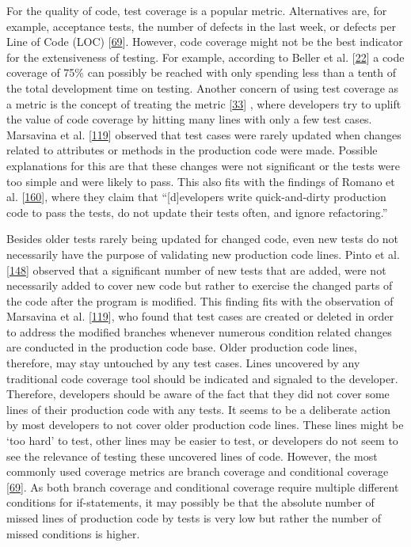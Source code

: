 \documentclass[]{book}
\begin{document}
For the quality of code, test coverage is a popular metric. Alternatives
are, for example, acceptance tests, the number of defects in the last
week, or defects per Line of Code (LOC)
{[}\protect\hyperlink{ref-GAROUSI20131354}{69}{]}. However, code
coverage might not be the best indicator for the extensiveness of
testing. For example, according to Beller et al.
{[}\protect\hyperlink{ref-Beller:2015:DT:2819009.2819101}{22}{]} a code
coverage of 75\% can possibly be reached with only spending less than a
tenth of the total development time on testing. Another concern of using
test coverage as a metric is the concept of treating the metric
{[}\protect\hyperlink{ref-bouwers2012a}{33}{]} , where developers try to
uplift the value of code coverage by hitting many lines with only a few
test cases. Marsavina et al.
{[}\protect\hyperlink{ref-marsavina2014}{119}{]} observed that test
cases were rarely updated when changes related to attributes or methods
in the production code were made. Possible explanations for this are
that these changes were not significant or the tests were too simple and
were likely to pass. This also fits with the findings of Romano et al.
{[}\protect\hyperlink{ref-ROMANO201764}{160}{]}, where they claim that
``{[}d{]}evelopers write quick-and-dirty production code to pass the
tests, do not update their tests often, and ignore refactoring.''

Besides older tests rarely being updated for changed code, even new
tests do not necessarily have the purpose of validating new production
code lines. Pinto et al.
{[}\protect\hyperlink{ref-pinto2012understanding}{148}{]} observed that
a significant number of new tests that are added, were not necessarily
added to cover new code but rather to exercise the changed parts of the
code after the program is modified. This finding fits with the
observation of Marsavina et al.
{[}\protect\hyperlink{ref-marsavina2014}{119}{]}, who found that test
cases are created or deleted in order to address the modified branches
whenever numerous condition related changes are conducted in the
production code base. Older production code lines, therefore, may stay
untouched by any test cases. Lines uncovered by any traditional code
coverage tool should be indicated and signaled to the developer.
Therefore, developers should be aware of the fact that they did not
cover some lines of their production code with any tests. It seems to be
a deliberate action by most developers to not cover older production
code lines. These lines might be `too hard' to test, other lines may be
easier to test, or developers do not seem to see the relevance of
testing these uncovered lines of code. However, the most commonly used
coverage metrics are branch coverage and conditional coverage
{[}\protect\hyperlink{ref-GAROUSI20131354}{69}{]}. As both branch
coverage and conditional coverage require multiple different conditions
for if-statements, it may possibly be that the absolute number of missed
lines of production code by tests is very low but rather the number of
missed conditions is higher.
\end{document}
